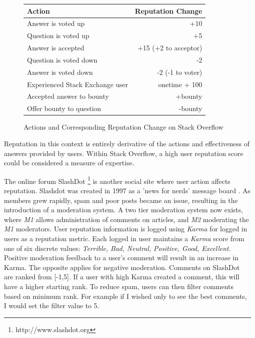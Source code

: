 \begin{figure}[h!]
\begin{center}
\begin{tabular}{l|r}
 Action & Reputation Change\\ \hline
 Answer is voted up & +10 \\
 Question is voted up & +5 \\
 Answer is accepted & +15 (+2 to acceptor) \\
 Question is voted down & -2 \\
 Answer is voted down & -2 (-1 to voter) \\
 Experienced Stack Exchange user & onetime + 100 \\
 Accepted answer to bounty & +bounty \\
 Offer bounty to question & -bounty \\ 
\end{tabular}
\end{center}
\caption{Actions and Corresponding Reputation Change on Stack Overflow \cite{movshovitzanalysis}}
\end{figure}



Reputation in this context is entirely derivative of the actions and effectiveness of answers provided by users. Within Stack Overflow, a high user reputation score could be considered a measure of expertise.

The online forum SlashDot \footnote{http://www.slashdot.org} is another social site where user action affects reputation. Slashdot was created in 1997 as a 'news for nerds' message board \cite{josang2007survey}. As members grew rapidly, spam and poor posts became an issue, resulting in the introduction of a moderation system. A two tier moderation system now exists, where \textit{M1} allows administration of comments on articles, and \textit{M2} moderating the \textit{M1} moderators. User reputation information is logged using \textit{Karma} for logged in users as a reputation metric. Each logged in user maintains a \textit{Karma} score from one of six discrete values: \textit{Terrible, Bad, Neutral, Positive, Good, Excellent}. Positive moderation feedback to a user's comment will result in an increase in Karma. The opposite applies for negative moderation. Comments on SlashDot are ranked from [-1,5]. If a user with high Karma created a comment, this will have a higher starting rank. To reduce spam, users can then filter comments based on minimum rank. For example if I wished only to see the best comments, I would set the filter value to 5. 


